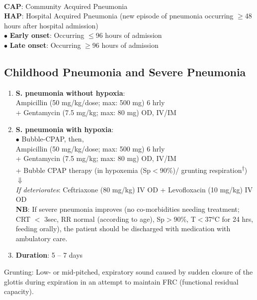 \documentclass[11pt,a4paper]{report}
\begin{document}
~\\ \noindent
\textbf{CAP}: Community Acquired Pneumonia\\
\textbf{HAP}: Hospital Acquired Pneumonia (new episode of pneumonia occurring $\geq$48 hours after hospital admission) \\
$\bullet$ \hspace{1 mm} \textbf{Early onset}: Occurring $\leq$96 hours of admission\\
$\bullet$ \hspace{1 mm} \textbf{Late onset}: Occurring $\geq$96 hours of admission

\subsection{Childhood Pneumonia and Severe Pneumonia}
\begin{enumerate}
	\item \textbf{S. pneumonia without hypoxia}:\\ 
	Ampicillin (50 mg/kg/dose; max: 500 mg) 6 hrly \\
	+ Gentamycin (7.5 mg/kg; max: 80 mg) OD, IV/IM
	\item \textbf{S. pneumonia with hypoxia}: \\
	{\color{red}$\bullet$} Bubble-CPAP, then,  \\
	Ampicillin (50 mg/kg/dose; max: 500 mg) 6 hrly \\
	+ Gentamycin (7.5 mg/kg; max: 80 mg) OD, IV/IM \\
	+ Bubble CPAP  therapy (in hypoxemia (Sp$<$90\%)/ grunting respiration\textsuperscript{$\dagger$})\\
	$\Downarrow$\\
	\textit{If deteriorates}: Ceftriaxone (80 mg/kg) IV OD + Levofloxacin (10 mg/kg) IV OD\\
	\textbf{NB}: If severe pneumonia improves (no co-morbidities needing treatment; CRT $<$ 3sec, RR normal (according to age), Sp$>$90\%, T$<$37\si{\celsius} for 24 hrs, feeding orally), the patient should be discharged with medication with ambulatory care.
	\item \textbf{Duration}: 5 -- 7 days 
\end{enumerate}

\noindent {\color{red}$\dagger$} Grunting: Low- or mid-pitched, expiratory sound caused by sudden closure of the glottis during expiration in an attempt to maintain FRC (functional residual capacity). \cite{reuter2014respiratory} \\
\end{document}
